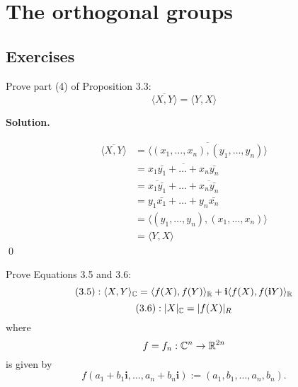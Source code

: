\documentclass[12pt]{book}
\theoremstyle{definition}
\newenvironment{solution}
{%
  \par\noindent\textbf{Solution.}\quad
}
{%
  \qed\par
}
\begin{document}
\chapter{The orthogonal groups}
\section{Exercises}

\begin{taggedexercise}[\textcolor{green}{Complete}]
  Prove part (4) of Proposition 3.3:
  \[
  \overline{\langle X, Y \rangle} = \langle Y, X \rangle
  \]
\end{taggedexercise}
\begin{solution}
  \[
  \begin{aligned}
    \overline{\langle X, Y \rangle} &= \overline{\langle (x_1, \dots , x_n), (y_1, \dots , y_n) \rangle} \\
                                    &= \overline{x_1\bar{y_1} + \dots + x_n\bar{y_n}} \\
                                    &= \overline{x_1 \bar{y_1}} + \dots + \overline{x_n \bar{y_n}} \\
                                    &= y_1\bar{x_1} + \dots + y_n\bar{x_n} \\
                                    &= \langle (y_1, \dots , y_n), (x_1, \dots , x_n) \rangle \\
                                    &= \langle Y, X \rangle
  \end{aligned}
  \]
\end{solution}


\begin{taggedexercise}[\textcolor{green}{Complete}]
  Prove Equations 3.5 and 3.6:
  \[
    (3.5) :  \langle X, Y \rangle_{\mathbb{C}} = \langle f(X), f(Y) \rangle_{\mathbb{R}} + \mathbf{i} \langle f(X), f(\mathbf{i}Y) \rangle_{\mathbb{R}}
  \]
  \[
    (3.6) : |X|_{\mathbb{C}} = |f(X)|_R
  \]
  where
  \[
  f = f_n: \mathbb{C}^{n} \to \mathbb{R}^{2n}
  \]
  is given by
  \[
  f(a_1 + b_1\mathbf{i}, \dots , a_n+b_n\mathbf{i}) := (a_1, b_1, \dots, a_n, b_n).
  \]
\end{taggedexercise}
\end{document}
